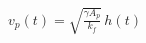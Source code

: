 \documentclass[preview]{standalone}
\begin{document}
\begin{align*}
v_p(t) = \sqrt{\frac{\gamma A_p}{k_f}}\, h(t)
\end{align*}
\end{document}
